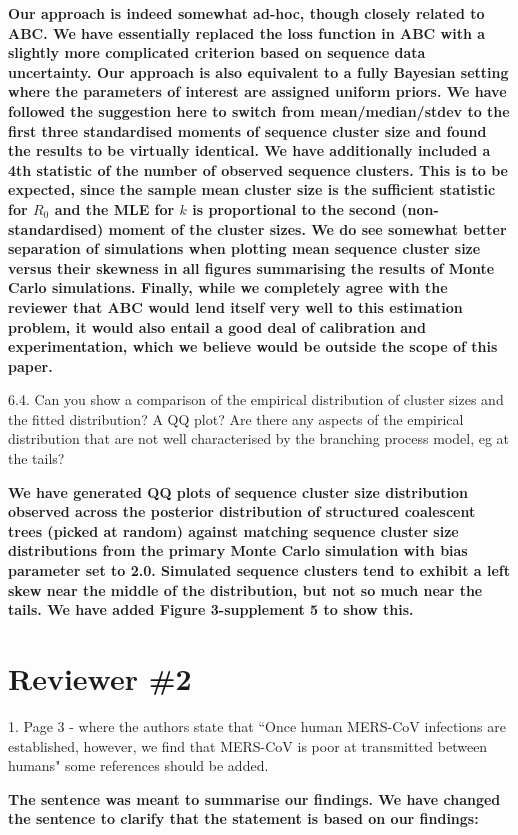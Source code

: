 \documentclass[11pt,oneside,letterpaper]{article}
\begin{document}
\textbf{Our approach is indeed somewhat ad-hoc, though closely related to ABC.
We have essentially replaced the loss function in ABC with a slightly more complicated criterion based on  sequence data uncertainty.
Our approach is also equivalent to a fully Bayesian setting where the parameters of interest are assigned uniform priors.
We have followed the suggestion here to switch from mean/median/stdev to the first three standardised moments of sequence cluster size and found the results to be virtually identical.
We have additionally included a 4th statistic of the number of observed sequence clusters.
This is to be expected, since the sample mean cluster size is the sufficient statistic for $R_0$ and the MLE for $k$ is proportional to the second (non-standardised) moment of the cluster sizes.
We do see somewhat better separation of simulations when plotting mean sequence cluster size versus their skewness in all figures summarising the results of Monte Carlo simulations.
Finally, while we completely agree with the reviewer that ABC would lend itself very well to this estimation problem, it would also entail a good deal of calibration and experimentation, which we believe would be outside the scope of this paper. %
}


6.4. Can you show a comparison of the empirical distribution of cluster sizes and the fitted distribution? A QQ plot? Are there any aspects of the empirical distribution that are not well characterised by the branching process model, eg at the tails?

\textbf{We have generated QQ plots of sequence cluster size distribution observed across the posterior distribution of structured coalescent trees (picked at random) against matching sequence cluster size distributions from the primary Monte Carlo simulation with bias parameter set to 2.0. Simulated sequence clusters tend to exhibit a left skew near the middle of the distribution, but not so much near the tails. We have added Figure 3-supplement 5 to show this.}


\section*{Reviewer \#2}

1. Page 3 - where the authors state that ``Once human MERS-CoV infections are established, however, we find that MERS-CoV is poor at transmitted between humans" some references should be added.

\textbf{The sentence was meant to summarise our findings. We have changed the sentence to clarify that the statement is based on our findings:}
\end{document}
